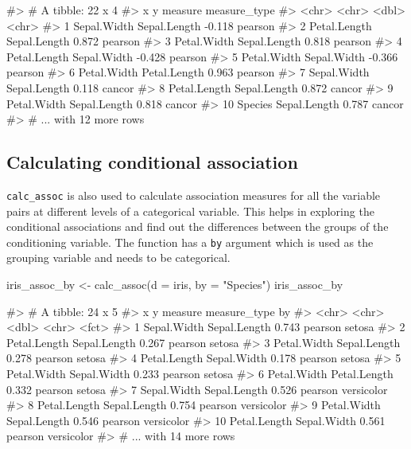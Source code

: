 \begin{Schunk}
\begin{Soutput}
#> # A tibble: 22 x 4
#>    x            y            measure measure_type
#>    <chr>        <chr>          <dbl> <chr>       
#>  1 Sepal.Width  Sepal.Length  -0.118 pearson     
#>  2 Petal.Length Sepal.Length   0.872 pearson     
#>  3 Petal.Width  Sepal.Length   0.818 pearson     
#>  4 Petal.Length Sepal.Width   -0.428 pearson     
#>  5 Petal.Width  Sepal.Width   -0.366 pearson     
#>  6 Petal.Width  Petal.Length   0.963 pearson     
#>  7 Sepal.Width  Sepal.Length   0.118 cancor      
#>  8 Petal.Length Sepal.Length   0.872 cancor      
#>  9 Petal.Width  Sepal.Length   0.818 cancor      
#> 10 Species      Sepal.Length   0.787 cancor      
#> # ... with 12 more rows
\end{Soutput}
\end{Schunk}

\hypertarget{calculating-conditional-association}{%
\subsection{Calculating conditional
association}\label{calculating-conditional-association}}

\texttt{calc\_assoc} is also used to calculate association measures for
all the variable pairs at different levels of a categorical variable.
This helps in exploring the conditional associations and find out the
differences between the groups of the conditioning variable. The
function has a \texttt{by} argument which is used as the grouping
variable and needs to be categorical.

\begin{Schunk}
\begin{Sinput}
iris_assoc_by <- calc_assoc(d = iris,
                            by = "Species")
iris_assoc_by
\end{Sinput}
\begin{Soutput}
#> # A tibble: 24 x 5
#>    x            y            measure measure_type by        
#>    <chr>        <chr>          <dbl> <chr>        <fct>     
#>  1 Sepal.Width  Sepal.Length   0.743 pearson      setosa    
#>  2 Petal.Length Sepal.Length   0.267 pearson      setosa    
#>  3 Petal.Width  Sepal.Length   0.278 pearson      setosa    
#>  4 Petal.Length Sepal.Width    0.178 pearson      setosa    
#>  5 Petal.Width  Sepal.Width    0.233 pearson      setosa    
#>  6 Petal.Width  Petal.Length   0.332 pearson      setosa    
#>  7 Sepal.Width  Sepal.Length   0.526 pearson      versicolor
#>  8 Petal.Length Sepal.Length   0.754 pearson      versicolor
#>  9 Petal.Width  Sepal.Length   0.546 pearson      versicolor
#> 10 Petal.Length Sepal.Width    0.561 pearson      versicolor
#> # ... with 14 more rows
\end{Soutput}
\end{Schunk}

